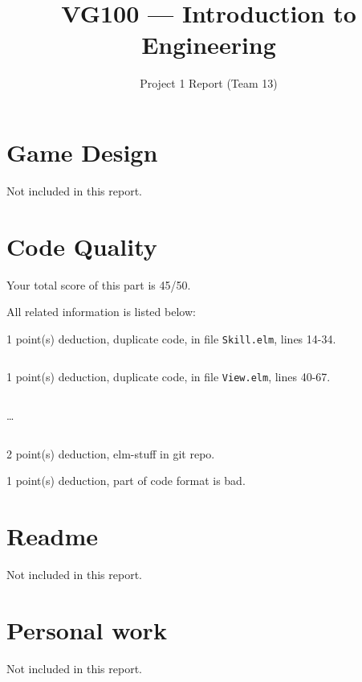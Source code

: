 \documentclass{article}
\title{VG100 --- Introduction to\\ Engineering}
\subtitle{Project 1 Report (Team 13)}
\begin{document}
\maketitle

\section{Game Design}

Not included in this report.

\section{Code Quality}

Your total score of this part is 45/50. \medskip

All related information is listed below: \medskip

1 point(s) {\color{red}deduction}, duplicate code, in file {\color{blue}\texttt{Skill.elm}}, lines {\color{blue}14-34}.

\inputminted[firstline=14,lastline=34]{elm}{Skill.elm}

1 point(s) {\color{red}deduction}, duplicate code, in file {\color{blue}\texttt{View.elm}}, lines {\color{blue}40-67}.

\inputminted[firstline=40,lastline=49]{elm}{View.elm}

\dots

\inputminted[firstline=58,lastline=67]{elm}{View.elm}

2 point(s) {\color{red}deduction}, elm-stuff in git repo.\medskip

1 point(s) {\color{red}deduction}, part of code format is bad.\medskip



\newpage

\section{Readme}

Not included in this report.

\section{Personal work}

Not included in this report.


\newpage
\end{document}
